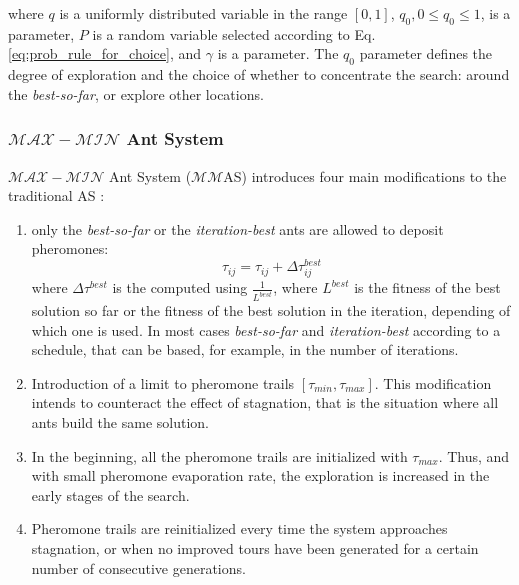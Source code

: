 					\noindent where $q$ is a uniformly distributed variable in the range $[0,1]$, $q_{0}, 0 \leq q_{0} \leq 1$, is a parameter, $P$ is a random variable selected according to Eq. \eqref{eq:prob_rule_for_choice}, and $\gamma$ is a parameter. The $q_{0}$ parameter defines the degree of exploration and the choice of whether to concentrate the search: around the \emph{best-so-far}, or explore other locations.


					\subsubsection*{$\mathcal{MAX}-\mathcal{MIN}$ Ant System}
					$\mathcal{MAX}-\mathcal{MIN}$ Ant System ($\mathcal{MM}$AS) introduces four main modifications to the traditional AS \cite{stutzle00}:
					\begin{enumerate}
						\item only the \emph{best-so-far} or the \emph{iteration-best} ants are allowed to deposit pheromones:
							\begin{equation}
								\label{eq:max_min_rank_pheromone_update}
								\tau_{ij} = \tau_{ij} + \Delta\tau_{ij}^{best}
							\end{equation}
							\noindent where $\Delta\tau^{best}$ is the computed using $\frac{1} {L^{best}}$, where ${L^{best}}$ is the fitness of the best solution so far or the fitness of the best solution in the iteration, depending of which one is used. In most cases \emph{best-so-far} and \emph{iteration-best} according to a schedule, that can be based, for example, in the number of iterations.
						
						\item Introduction of a limit to pheromone trails $[\tau_{min},\tau_{max}]$. This modification intends to counteract the effect of stagnation, that is the situation where all ants build the same solution.
						
						\item In the beginning, all the pheromone trails are initialized with $\tau_{max}$. Thus, and with small pheromone evaporation rate, the exploration is increased in the early stages of the search.
						
						\item Pheromone trails are reinitialized every time the system approaches stagnation, or when no improved tours have been generated for a certain number of consecutive generations.
						 					
					\end{enumerate}
		

